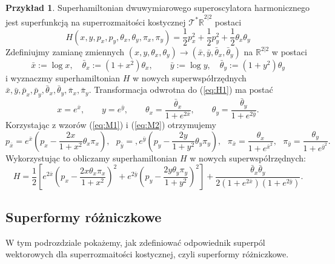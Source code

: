 \documentclass[11pt,a4paper]{report}
\theoremstyle{definition}
\newtheorem{example}[theorem]{Przykład}
\begin{document}
\begin{example} 
Superhamiltonian dwuwymiarowego superoscylatora harmonicznego jest superfunkcją na superrozmaitości kostycznej $\mathcal{T^*\mathbb{R}}^{2|2}$ postaci
\begin{equation*}
H(x,y,p_x, p_y, \theta_x, \theta_y, \pi_x, \pi_y) = \frac12 p_x^2 + \frac12 p_y^2 + \frac12 \theta_x \theta_y
\end{equation*}
Zdefiniujmy zamianę zmiennych $(x, y, \theta_x, \theta_y) \rightarrow (\bar x, \bar y, \bar \theta_x, \bar \theta_y)$ na $\mathbb{R}^{2|2}$ w postaci
\begin{equation}
\label{eq:H1}
	\bar x:=\log x,\quad \bar \theta_x:=(1+x^2)\theta_x,\qquad \bar y:=\log y,\quad\bar \theta_y:=(1+y^2)\theta_y 
\end{equation}
i wyznaczmy superhamiltonian $H$ w nowych superwspółrzędnych $\bar x, \bar y, \bar p_x, \bar p_y, \bar \theta_x, \bar \theta_y, \bar \pi_x, \bar \pi_y$. Transformacja odwrotna do (\ref{eq:H1}) ma postać
\begin{equation*}
x=e^{\bar x},\qquad y=e^{\bar y},\qquad \theta_x=\frac{\bar\theta_x }{1+e^{2\bar x}},\qquad \theta_y=\frac{\bar\theta_y }{1+e^{2\bar y}}.
\end{equation*}
Korzystając z wzorów (\ref{eq:M1}) i (\ref{eq:M2}) otrzymujemy
\begin{equation*}
p_{\bar x}=e^{\bar x}\left(p_x-\frac{2x}{1+x^2}\theta_x\pi_x\right),\,\,\,\,
p_{\bar y}=,e^{\bar y}\left(p_y-\frac{2y}{1+y^2}\theta_y\pi_y\right),\,\,\,\,\pi_{\bar x}=\frac{\theta_x}{1+e^{\bar x^2}},\,\,\,\,\pi_{\bar y}=\frac{\theta_y}{1+e^{\bar y^2}}.
\end{equation*}
Wykorzystując to obliczamy superhamiltonian $H$ w nowych superwspółrzędnych:
\begin{equation*}
H = \frac12\left[e^{2\bar x}\left(p_x-\frac{2x\theta_x\pi_x}{1+x^2}\right)^2+e^{2\bar y}\left(p_y-\frac{2y\theta_y\pi_y}{1+y^2}\right)^2\right]+\frac{\bar \theta_x\bar \theta_y}{2(1+e^{2\bar x})(1+e^{2\bar y})}.
\end{equation*}
\end{example}

\subsection{Superformy różniczkowe}

W tym podrozdziale pokażemy, jak zdefiniować odpowiednik superpól wektorowych dla superrozmaitości kostycznej, czyli superformy różniczkowe. 
\end{document}
